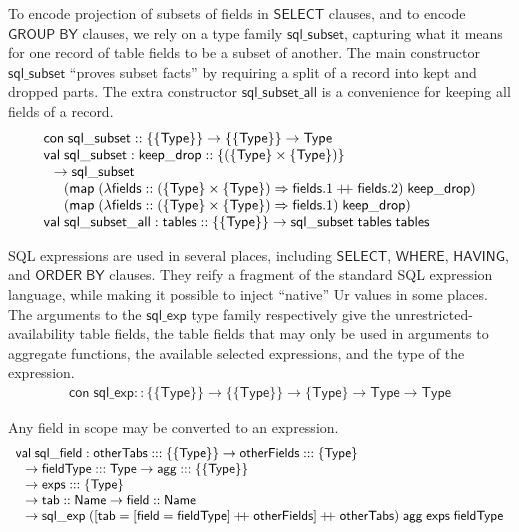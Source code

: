 \documentclass{article}
\newcommand{\mt}[1]{\mathsf{#1}}
\newcommand{\rc}{+ \hspace{-.075in} + \;}
\begin{document}
To encode projection of subsets of fields in $\mt{SELECT}$ clauses, and to encode $\mt{GROUP} \; \mt{BY}$ clauses, we rely on a type family $\mt{sql\_subset}$, capturing what it means for one record of table fields to be a subset of another.  The main constructor $\mt{sql\_subset}$ ``proves subset facts'' by requiring a split of a record into kept and dropped parts.  The extra constructor $\mt{sql\_subset\_all}$ is a convenience for keeping all fields of a record.
$$\begin{array}{l}
  \mt{con} \; \mt{sql\_subset} :: \{\{\mt{Type}\}\} \to \{\{\mt{Type}\}\} \to \mt{Type} \\
  \mt{val} \; \mt{sql\_subset} : \mt{keep\_drop} :: \{(\{\mt{Type}\} \times \{\mt{Type}\})\} \\
  \hspace{.1in} \to \mt{sql\_subset} \\
  \hspace{.2in} (\mt{map} \; (\lambda \mt{fields} :: (\{\mt{Type}\} \times \{\mt{Type}\}) \Rightarrow \mt{fields}.1 \rc \mt{fields}.2)\; \mt{keep\_drop}) \\
  \hspace{.2in} (\mt{map} \; (\lambda \mt{fields} :: (\{\mt{Type}\} \times \{\mt{Type}\}) \Rightarrow \mt{fields}.1) \; \mt{keep\_drop}) \\
\mt{val} \; \mt{sql\_subset\_all} : \mt{tables} :: \{\{\mt{Type}\}\} \to \mt{sql\_subset} \; \mt{tables} \; \mt{tables}
\end{array}$$

SQL expressions are used in several places, including $\mt{SELECT}$, $\mt{WHERE}$, $\mt{HAVING}$, and $\mt{ORDER} \; \mt{BY}$ clauses.  They reify a fragment of the standard SQL expression language, while making it possible to inject ``native'' Ur values in some places.  The arguments to the $\mt{sql\_exp}$ type family respectively give the unrestricted-availability table fields, the table fields that may only be used in arguments to aggregate functions, the available selected expressions, and the type of the expression.
$$\begin{array}{l}
  \mt{con} \; \mt{sql\_exp} :: \{\{\mt{Type}\}\} \to \{\{\mt{Type}\}\} \to \{\mt{Type}\} \to \mt{Type} \to \mt{Type}
\end{array}$$

Any field in scope may be converted to an expression.
$$\begin{array}{l}
  \mt{val} \; \mt{sql\_field} : \mt{otherTabs} ::: \{\{\mt{Type}\}\} \to \mt{otherFields} ::: \{\mt{Type}\} \\
  \hspace{.1in} \to \mt{fieldType} ::: \mt{Type} \to \mt{agg} ::: \{\{\mt{Type}\}\} \\
  \hspace{.1in} \to \mt{exps} ::: \{\mt{Type}\} \\
  \hspace{.1in} \to \mt{tab} :: \mt{Name} \to \mt{field} :: \mt{Name} \\
  \hspace{.1in} \to \mt{sql\_exp} \; ([\mt{tab} = [\mt{field} = \mt{fieldType}] \rc \mt{otherFields}] \rc \mt{otherTabs}) \; \mt{agg} \; \mt{exps} \; \mt{fieldType}
\end{array}$$
\end{document}
